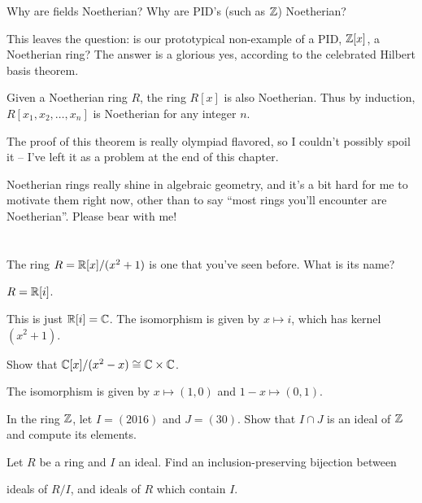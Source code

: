 \begin{ques}
	Why are fields Noetherian?
	Why are PID's (such as $\mathbb Z$) Noetherian?
\end{ques}

This leaves the question:
is our prototypical non-example of a PID,
$\mathbb Z[x]$, a Noetherian ring?
The answer is a glorious yes,
according to the celebrated Hilbert basis theorem.
\begin{theorem}
	Given a Noetherian ring $R$,
	the ring $R[x]$ is also Noetherian.
	Thus by induction, $R[x_1, x_2, \dots, x_n]$ is Noetherian
	for any integer $n$.
	\label{thm:hilbert_basis}
\end{theorem}
The proof of this theorem is really olympiad flavored,
so I couldn't possibly spoil it -- I've
left it as a problem at the end of this chapter.

Noetherian rings really shine in algebraic geometry,
and it's a bit hard for me to motivate them right now,
other than to say
``most rings you'll encounter are Noetherian''.
Please bear with me!

\section{\problemhead}

\begin{problem}
	The ring $R = \mathbb R[x] / (x^2+1)$ is one that you've seen before.
	What is its name?
	\begin{hint}
		$R = \mathbb R[i]$.
	\end{hint}
	\begin{sol}
		This is just $\mathbb R[i] = \mathbb C$.
		The isomorphism is given by $x \mapsto i$,
		which has kernel $(x^2+1)$.
	\end{sol}
\end{problem}

\begin{problem}
	Show that $\mathbb C[x] / (x^2-x) \cong \mathbb C \times \mathbb C$.
	\begin{hint}
		The isomorphism is given by $x \mapsto (1,0)$
		and $1-x \mapsto (0,1)$.
	\end{hint}
\end{problem}

\begin{problem}
	In the ring $\mathbb Z$, let $I = (2016)$ and $J = (30)$.
	Show that $I \cap J$ is an ideal of $\mathbb Z$ and compute its elements.
\end{problem}

\begin{sproblem}
	\label{prob:inclusion_preserving}
	Let $R$ be a ring and $I$ an ideal.
	Find an inclusion-preserving bijection between
	\begin{itemize}
		\ii ideals of $R/I$, and
		\ii ideals of $R$ which contain $I$.
	\end{itemize}
\end{sproblem}

